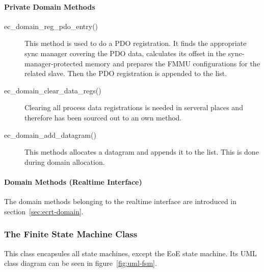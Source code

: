 \documentclass[a4paper,12pt,BCOR6mm,bibtotoc,idxtotoc]{scrbook}
\begin{document}
\paragraph{Private Domain Methods}

\begin{description}
\item[ec\_domain\_reg\_pdo\_entry()] This method is used to do a PDO
  registration. It finds the appropriate sync manager covering the PDO
  data, calculates its offset in the sync-manager-protected memory and
  prepares the FMMU configurations for the related slave. Then the PDO
  registration is appended to the list.
\item[ec\_domain\_clear\_data\_regs()] Clearing all process data
  registrations is needed in serveral places and therefore has been
  sourced out to an own method.
\item[ec\_domain\_add\_datagram()] This methods allocates a datagram
  and appends it to the list. This is done during domain allocation.
\end{description}

\paragraph{Domain Methods (Realtime Interface)}

The domain methods belonging to the realtime interface are introduced
in section~\ref{sec:ecrt-domain}.


\subsubsection{The Finite State Machine Class}
\label{sec:class-fsm}

This class encapsules all state machines, except the EoE state
machine. Its UML class diagram can be seen in
figure~\ref{fig:uml-fsm}.
\end{document}
